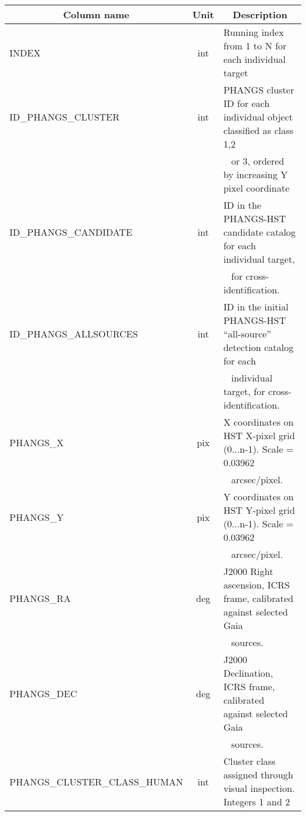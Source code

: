 %
\begin{table*}
\centering
\caption{Content description for the PHANGS-HST DR4/CR2 observed property catalogs of clusters and compact associations.  Source positions were determined in the V-band at the detection stage, generally stemming from the \textsc{DOLPHOT} PSF-fitting photometry measurements and have not been optimized with post-facto centroiding or fitting of extended source models.  This can cause source positions to be shifted slightly ($\sim$~1~pixel) from the true location, but has negligible influence on our photometry due to use of a 4 pixel radius aperture. Upcoming structural fitting of C1+C2 clusters, for the purpose of measuring effective radii, will refine source positions.}
\label{tab:cat_content}
\begin{tabular}{lcl}
\hline\hline
\multicolumn{1}{c}{Column name} & \multicolumn{1}{c}{Unit} & \multicolumn{1}{c}{Description} \\ 
\hline
INDEX & int & Running index from 1 to N for each individual target \\ 
ID\_PHANGS\_CLUSTER & int & PHANGS cluster ID for each individual object classified as class 1,2 \\ 
 &  &  \,\,\, or 3, ordered by increasing Y pixel coordinate \\ 
ID\_PHANGS\_CANDIDATE & int & ID in the PHANGS-HST candidate catalog for each individual target, \\ 
 &  &  \,\,\, for cross-identification. \\ 
ID\_PHANGS\_ALLSOURCES & int & ID in the initial PHANGS-HST “all-source” detection catalog for each \\ 
 &  &  \,\,\, individual target, for cross-identification. \\ 
PHANGS\_X & pix & X coordinates on HST X-pixel grid (0...n-1). Scale = 0.03962 \\ 
 &  &  \,\,\, arcsec/pixel. \\ 
PHANGS\_Y & pix & Y coordinates on HST Y-pixel grid (0...n-1). Scale = 0.03962 \\ 
 &  &  \,\,\, arcsec/pixel. \\ 
PHANGS\_RA & deg & J2000 Right ascension, ICRS frame, calibrated against selected Gaia \\ 
 &  &  \,\,\, sources. \\ 
PHANGS\_DEC & deg & J2000 Declination, ICRS frame, calibrated against selected Gaia \\ 
 &  &  \,\,\, sources. \\ 
PHANGS\_CLUSTER\_CLASS\_HUMAN & int & Cluster class assigned through visual inspection. Integers 1 and 2 \\ 

\end{tabular}
\end{table*}
